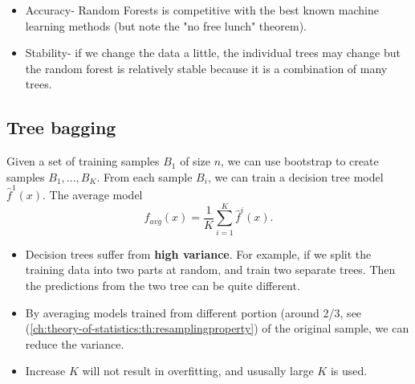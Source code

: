 \begin{refsection}
\begin{remark}\hfill
\begin{itemize}
	\item Accuracy- Random Forests is competitive with the best known
	machine learning methods (but note the "no free lunch"
	theorem).
	\item Stability- if we change the data a little, the individual trees
	may change but the random forest is relatively stable because it is a
	combination of many trees.
\end{itemize}	
\end{remark}


\subsection{Tree bagging}
\begin{definition}[bagging]
	Given a set of training samples $B_1$ of size $n$, we can use bootstrap to create samples $B_1,...,B_K$. From each sample $B_i$, we can train a decision tree model $\hat{f}^1(x)$. The average model 
	$$\hat{f}_{avg}(x) = \frac{1}{K}\sum_{i=1}^K \hat{f}^i(x).$$
\end{definition}


\begin{remark}\hfill
	\begin{itemize}
		\item Decision trees suffer from \textbf{high variance}. For example, if we split the training data into two parts at random, and train two separate trees. Then the predictions from the two tree can be quite different. 
		\item By averaging models trained from different portion (around 2/3, see (\autoref{ch:theory-of-statistics:th:resamplingproperty}) of the original sample, we can reduce the variance. 
		\item Increase $K$ will not result in overfitting, and ususally large $K$ is used. 
	\end{itemize}
\end{remark}



\end{refsection}
